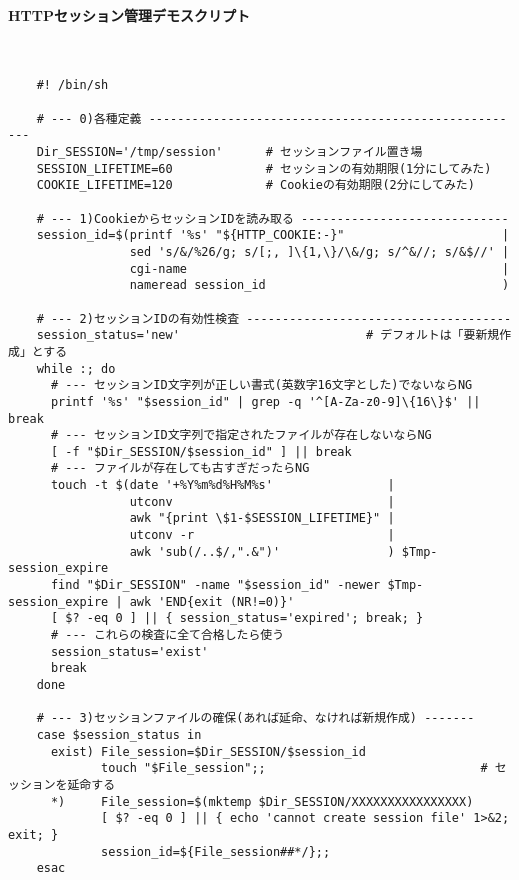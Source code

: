 \paragraph{HTTPセッション管理デモスクリプト} 　\\
\begin{frameboxit}{160.0mm}
\begin{verbatim}
	#! /bin/sh
	
	# --- 0)各種定義 -----------------------------------------------------
	Dir_SESSION='/tmp/session'      # セッションファイル置き場
	SESSION_LIFETIME=60             # セッションの有効期限(1分にしてみた)
	COOKIE_LIFETIME=120             # Cookieの有効期限(2分にしてみた)
	
	# --- 1)CookieからセッションIDを読み取る -----------------------------
	session_id=$(printf '%s' "${HTTP_COOKIE:-}"                      |
	             sed 's/&/%26/g; s/[;, ]\{1,\}/\&/g; s/^&//; s/&$//' |
	             cgi-name                                            |
	             nameread session_id                                 )
	
	# --- 2)セッションIDの有効性検査 -------------------------------------
	session_status='new'                          # デフォルトは「要新規作成」とする
	while :; do
	  # --- セッションID文字列が正しい書式(英数字16文字とした)でないならNG
	  printf '%s' "$session_id" | grep -q '^[A-Za-z0-9]\{16\}$' || break
	  # --- セッションID文字列で指定されたファイルが存在しないならNG
	  [ -f "$Dir_SESSION/$session_id" ] || break
	  # --- ファイルが存在しても古すぎだったらNG
	  touch -t $(date '+%Y%m%d%H%M%s'                |
	             utconv                              |
	             awk "{print \$1-$SESSION_LIFETIME}" |
	             utconv -r                           |
	             awk 'sub(/..$/,".&")'               ) $Tmp-session_expire
	  find "$Dir_SESSION" -name "$session_id" -newer $Tmp-session_expire | awk 'END{exit (NR!=0)}'
	  [ $? -eq 0 ] || { session_status='expired'; break; }
	  # --- これらの検査に全て合格したら使う
	  session_status='exist'
	  break
	done
	
	# --- 3)セッションファイルの確保(あれば延命、なければ新規作成) -------
	case $session_status in
	  exist) File_session=$Dir_SESSION/$session_id
	         touch "$File_session";;                              # セッションを延命する
	  *)     File_session=$(mktemp $Dir_SESSION/XXXXXXXXXXXXXXXX)
	         [ $? -eq 0 ] || { echo 'cannot create session file' 1>&2; exit; }
	         session_id=${File_session##*/};;
	esac
	

\end{verbatim}
\end{frameboxit}
